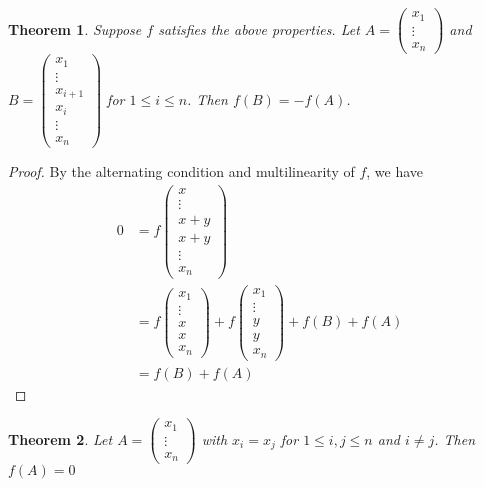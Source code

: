\documentclass{article}
\newtheorem{thm}{Theorem}
\begin{document}
\begin{thm}
Suppose $f$ satisfies the above properties. Let $A= \begin{pmatrix}
x_1 \\
\vdots \\
x_n
\end{pmatrix}$ and $B=\begin{pmatrix}
x_1 \\
\vdots \\ 
x_{i+1} \\ 
x_{i} \\ 
\vdots \\ 
x_n
\end{pmatrix}$
for $1\leq i\leq n$. Then $f(B)=-f(A)$. 
\end{thm}
\begin{proof}
By the alternating condition and multilinearity of $f$, we have 
\begin{align}
0&=f\begin{pmatrix}x \\ \vdots \\ x+y \\ x+y \\ \vdots \\ x_n \end{pmatrix} \\
&=f\begin{pmatrix} x_1 \\ \vdots \\ x \\ x \\ x_n\end{pmatrix} + f\begin{pmatrix} x_1 \\ \vdots \\ y \\ y \\ x_n\end{pmatrix} + f(B)+f(A) \\ 
&=f(B)+f(A)
\end{align}	
\end{proof}
\begin{thm}
Let $A=\begin{pmatrix}x_1 \\ \vdots \\ x_n\end{pmatrix}$ with $x_i=x_j$ for $1\leq i,j \leq n$ and $i\neq j$. Then $f(A)=0$
	
\end{thm}
\end{document}
